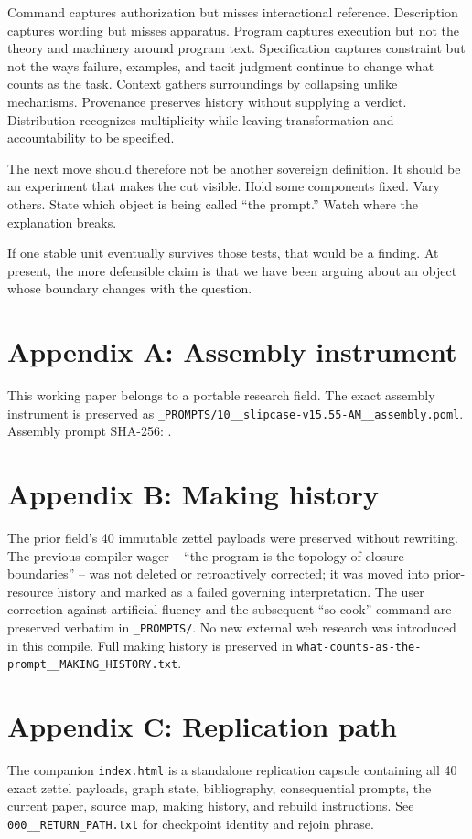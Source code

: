 \documentclass[11pt]{article}
\begin{document}
Command captures authorization but misses interactional reference. Description captures wording but misses apparatus. Program captures execution but not the theory and machinery around program text. Specification captures constraint but not the ways failure, examples, and tacit judgment continue to change what counts as the task. Context gathers surroundings by collapsing unlike mechanisms. Provenance preserves history without supplying a verdict. Distribution recognizes multiplicity while leaving transformation and accountability to be specified.

The next move should therefore not be another sovereign definition. It should be an experiment that makes the cut visible. Hold some components fixed. Vary others. State which object is being called “the prompt.” Watch where the explanation breaks.

If one stable unit eventually survives those tests, that would be a finding. At present, the more defensible claim is that we have been arguing about an object whose boundary changes with the question.

\printbibliography

\appendix
\section*{Appendix A: Assembly instrument}
This working paper belongs to a portable research field. The exact assembly instrument is preserved as \texttt{\_PROMPTS/10\_\_slipcase-v15.55-AM\_\_assembly.poml}. Assembly prompt SHA-256: \texttt{}.

\section*{Appendix B: Making history}
The prior field's 40 immutable zettel payloads were preserved without rewriting. The previous compiler wager -- “the program is the topology of closure boundaries” -- was not deleted or retroactively corrected; it was moved into prior-resource history and marked as a failed governing interpretation. The user correction against artificial fluency and the subsequent “so cook” command are preserved verbatim in \texttt{\_PROMPTS/}. No new external web research was introduced in this compile. Full making history is preserved in \texttt{what-counts-as-the-prompt\_\_MAKING\_HISTORY.txt}.

\section*{Appendix C: Replication path}
The companion \texttt{index.html} is a standalone replication capsule containing all 40 exact zettel payloads, graph state, bibliography, consequential prompts, the current paper, source map, making history, and rebuild instructions. See \texttt{000\_\_RETURN\_PATH.txt} for checkpoint identity and rejoin phrase.
\end{document}
